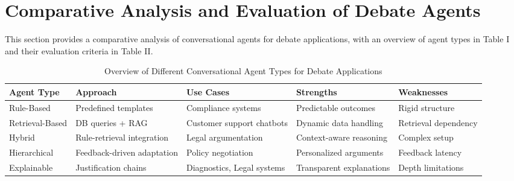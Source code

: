 \documentclass[conference]{IEEEtran}
\begin{document}
\section{Comparative Analysis and Evaluation of Debate Agents}
This section provides a comparative analysis of conversational agents for debate applications, with an overview of agent types in Table I and their evaluation criteria in Table II.
\begin{table}[ht]
    \centering
    \caption{Overview of Different Conversational Agent Types for Debate Applications}
    \label{tab:agents}
    \begin{tabular}{|>{\centering\arraybackslash}p{1.2cm}|>{\centering\arraybackslash}p{1.5cm}|>{\centering\arraybackslash}p{1.6cm}|>{\centering\arraybackslash}p{1.3cm}|>{\centering\arraybackslash}p{1.3cm}|}
    \hline
    \textbf{Agent Type}   & \textbf{Approach}                    & \textbf{Use Cases}                   & \textbf{Strengths}         & \textbf{Weaknesses}        \\ \hline
    Rule-Based           & Predefined templates                  & Compliance systems \cite{b12}        & Predictable outcomes       & Rigid structure            \\ \hline
    Retrieval-Based      & DB queries + RAG                      & Customer support chatbots \cite{b1}  & Dynamic data handling      & Retrieval dependency       \\ \hline
    Hybrid               & Rule-retrieval integration            & Legal argumentation \cite{b3}        & Context-aware reasoning    & Complex setup              \\ \hline
    Hierarchical         & Feedback-driven adaptation \cite{b5}  & Policy negotiation                   & Personalized arguments     & Feedback latency           \\ \hline
    Explainable          & Justification chains \cite{b13}       & Diagnostics, Legal systems           & Transparent explanations   & Depth limitations          \\ \hline
    \end{tabular}
\end{table}
\end{document}

